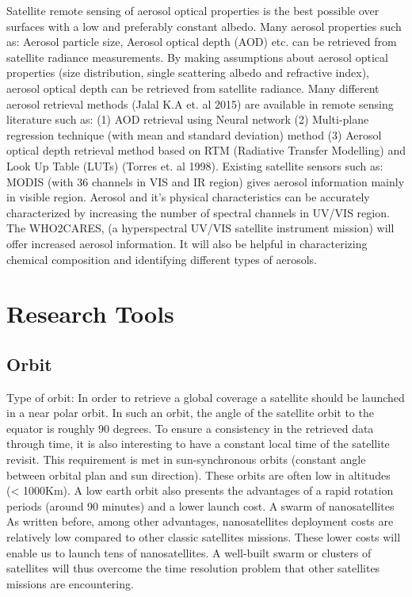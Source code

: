 \documentclass{scrartcl}
\begin{document}
Satellite remote sensing of aerosol optical properties is the best possible over surfaces with a low and preferably constant albedo. Many aerosol properties such as: Aerosol particle size, Aerosol optical depth (AOD) etc. can be retrieved from satellite radiance measurements. By making assumptions about aerosol optical properties (size distribution, single scattering albedo and refractive index), aerosol optical depth can be retrieved from satellite radiance. Many different aerosol retrieval methods (Jalal K.A et. al 2015) are available in remote sensing literature such as: (1) AOD retrieval using Neural network (2) Multi-plane regression technique (with mean and standard deviation) method (3) Aerosol optical depth retrieval method based on RTM (Radiative Transfer Modelling) and Look Up Table (LUTs) (Torres et. al 1998). Existing satellite sensors such as: MODIS (with 36 channels in VIS and IR region) gives aerosol information mainly in visible region. Aerosol and it’s physical characteristics can be accurately characterized by increasing the number of spectral channels in UV/VIS region. The WHO2CARES, (a hyperspectral UV/VIS satellite instrument mission) will offer increased aerosol information. It will also be helpful in characterizing chemical composition and identifying different types of aerosols. 


\section{Research Tools}
\label{sec:org58312b2}

\subsection{Orbit}
\label{sec:org1cac497}

    Type of orbit: In order to retrieve a global coverage a satellite should be
launched in a near polar orbit. In such an orbit, the angle of the satellite
orbit to the equator is roughly 90 degrees. To ensure a consistency in the
retrieved data through time, it is also interesting to have a constant local
time of the satellite revisit. This requirement is met in sun-synchronous orbits
(constant angle between orbital plan and sun direction). These orbits are often
low in altitudes (< 1000Km). A low earth orbit also presents the advantages of a
rapid rotation periods (around 90 minutes) and a lower launch cost. A swarm of
nanosatellites As written before, among other advantages, nanosatellites
deployment costs are relatively low compared to other classic satellites
missions. These lower costs will enable us to launch tens of nanosatellites. A
well-built swarm or clusters of satellites will thus overcome the time
resolution problem that other satellites missions are encountering.
\end{document}
